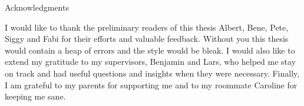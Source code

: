 \thispagestyle{empty}

\vspace*{20mm}

\begin{center}
{ Acknowledgments}
\end{center}

\vspace{10mm}

I would like to thank the preliminary readers of this thesis Albert, Bene, Pete, Siggy and Fabi for their efforts and valuable feedback.
Without you this thesis would contain a heap of errors and the style would be bleak.
I would also like to extend my gratitude to my supervisors, Benjamin and Lars, who helped me stay on track and had useful questions and insights when they were necessary.
Finally, I am grateful to my parents for supporting me and to my roommate Caroline for keeping me sane.

\cleardoublepage{}
